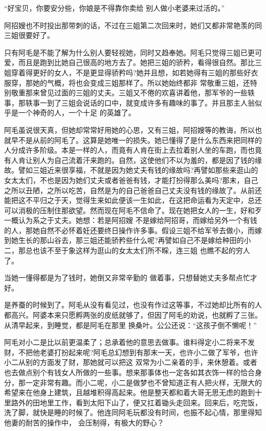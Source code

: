 \documentclass{article}
\begin{document}
“好宝贝，你要安分些，你娘是不得靠你卖给
别人做小老婆来过活的。” 

阿招嫂也不时投出那带刺的话，不过在三姐第二次回来时，她们又都非常艳羡的同三姐很要好了。

只有阿毛是不能了解为什么别人要轻视她，同时又趋奉她。阿毛只觉得三姐已更可爱，而且是跑到比她自己很高的地方去了。她把三姐的骄矜，看得很自然。那比三姐穿着得更好的女人，不是更显得骄矜吗?她并且想，如若她得有三姐的那些好衣服穿，那她的气概，将也会变成三姐那样了。所以她始终都非
\newpage
常敬重三姐，还特别敬重那来曾见过面的三姐的丈夫。三姐又不倦的欢喜讲着他，那军爷的一些轶事，那轶事一到了三姐会说话的口中，就变成许多有趣味的事了。并且那主人翁似乎是一个神奇的人，一个十足
的英雄了。 

阿毛虽说很天真，但她却常常好用她的心思，又有三姐，阿招嫂等的教诲，所以也就早不是从前的阿毛了。这算是她唯一的损失。她已懂得了是什么东西来把同样的人分成许多阶级。本是一样的人，而竟有人肯在街上去拉着别人坐的车跑，而也竟有人肯让别人为自己流着汗来跑的。自然，这使他们不以为羞的，都是因了钱的缘故。譬如三姐近来很享福，不就是因为她丈夫有钱的缘故吗?再譬如那些来逛山的女太太们，不也是因为她们丈夫或者爸爸有钱，才能打扮得那么美吗?那末，自己之所以丑陋，之所以吃苦，自然是为的自己爸爸自己丈夫没有钱的缘故了。从前还能把这不平归之于天，觉得生来如此便该一生如此，在这把命运看为天定中，总还可以消极的压制住那欲望。然而现在阿毛不信命了。现在她把女人的一生，好和歹一概认为系之于丈夫。她想：若是阿招嫂
\newpage
不是嫁给阿招哥，而嫁给另外一个有钱的人，那她自然不必怀着妊还要终日操作许多事。假设三姐不给军爷去做小，而嫁到她生长的那山谷去，那三姐还能骄矜些什么呢?再譬如自己不是嫁给种田的小二，那总也该不至于象这样为逛山的女太太们所不睬，连三姐
也瞧不起的穷人了。 

当她一懂得都是为了钱时，她倒又非常辛勤的
做着事，只想替她丈夫多帮点忙才好。 


是养蚕的时候到了。阿毛从没有看见过，也没有作过这等事，不过她却比所有的人都高兴。阿婆本来只愿孵两张的皮纸就够了，但因了阿毛的劝说，也就孵了三张。从清早起来，到睡觉，都是阿毛在那里
换桑叶。公公还说：“这孩子倒不懒呢！” 

阿毛对小二是比以前更温柔了；总承着他的意思去做事。谁料得定小二将来不发财，不把他老婆打扮起来呢?阿毛总幻想到有那末一天，也许小二做了军爷，也许小二从别的方面发了财，那她就可以把这
\newpage
双常为小二亲着的手，来休憩着。或者也去做点别个有钱女人所做的一些事。想来那事体也一定各如其衣饰一样的恰合身分，那一定非常有趣。而小二呢，小二是做梦也不曾知道正有人把火样，无限大的希望来在他身上建筑，且越堆积得高起来。他是整天都和着大哥无思无虑的跑到十里路外的田地里工作，看到太阳下山了，便又扛着锄头走回来。回来后，吃完饭，洗了脚，就快是睡的时候了。他连同阿毛玩都没有时间，也振不起心情，那里得知他妻的耐苦的操作中，
会压制得，有极大的野心？ 
\end{document}

